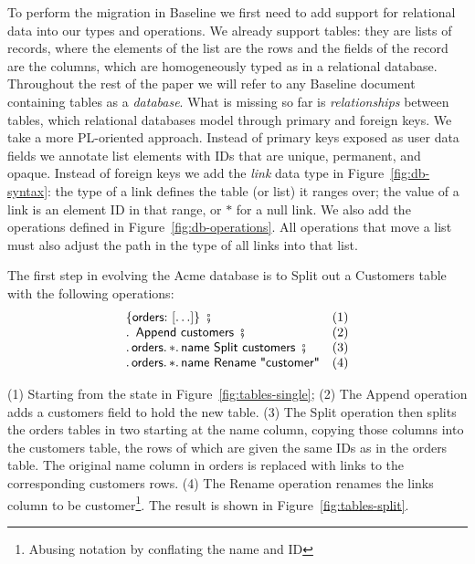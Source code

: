 \documentclass[english,submission]{programming}
\theoremstyle{definition}
\DeclareMathOperator{\exec}{\ \fatsemi\ \ }
\newcommand{\is}{{:}\ }
\newcommand{\quotedstring}[1]{\textsf{\textquotedbl{#1}\textquotedbl}}
\begin{document}
To perform the migration in Baseline we first need to add support for relational data into our types and operations.
We already support tables: they are lists of records, where the elements of the list are the rows and the fields of the record are the columns, which are homogeneously typed as in a relational database.
Throughout the rest of the paper we will refer to any Baseline document containing tables as a \textit{database}.
What is missing so far is \textit{relationships} between tables, which relational databases model through primary and foreign keys. We take a more PL-oriented approach.
Instead of primary keys exposed as user data fields we annotate list elements with IDs that are unique, permanent, and opaque. Instead of foreign keys we add the \textit{link} data type in Figure~\ref{fig:db-syntax}: the type of a link defines the table (or list) it ranges over; the value of a link is an element ID in that range, or $*$ for a null link. We also add the operations defined in Figure~\ref{fig:db-operations}. All operations that move a list must also adjust the path in the type of all links into that list.

The first step in evolving the Acme database is to \textsf{Split} out a \textsf{Customers} table with the following operations:
\[
\begin{array}{ll}
\{ \textsf{orders}\is [ \ldots ]\} \exec & \textrm{(1)}\\
\ldotp \textsf{ Append } \textsf{customers} \exec  & \textrm{(2)}\\
\ldotp \textsf{orders}\ldotp * \ldotp \textsf{name Split customers} \exec & \textrm{(3)}\\
\ldotp \textsf{orders}\ldotp * \ldotp \textsf{name Rename } \quotedstring{customer} & \textrm{(4)}\\
\end{array}\]


(1) Starting from the state in Figure~\ref{fig:tables-single};
(2) The \textsf{Append} operation adds a \textsf{customers} field to hold the new table. (3) The \textsf{Split} operation then splits the \textsf{orders} tables in two starting at the \textsf{name} column, copying those columns into the \textsf{customers} table, the rows of which are given the same IDs as in the \textsf{orders} table.
The original \textsf{name} column in \textsf{orders} is replaced with links to the corresponding \textsf{customers} rows.
(4) The \textsf{Rename} operation renames the links column to be \textsf{customer}\footnote{Abusing notation by conflating the name and ID}.
The result is shown in Figure~\ref{fig:tables-split}.
\end{document}
